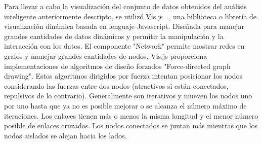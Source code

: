 Para llevar a cabo la visualización del conjunto de datos obtenidos del análisis inteligente anteriormente descripto, se utilizó Vis.js ~\cite{visjsPaginaWeb}, una biblioteca o librería de visualización dinámica basada en lenguaje Javascript. Diseñada para manejar grandes cantidades de datos dinámicos y permitir la manipulación y la interacción con los datos. El componente "Network" permite mostrar redes en grafos y manejar grandes cantidades de nodos. 
Vis.js proporciona implementaciones de algoritmos de diseño forzados "Force-directed graph drawing". Estos algoritmos dirigidos por fuerza intentan posicionar los nodos considerando las fuerzas entre dos nodos (atractivos si están conectados, repulsivos de lo contrario). Generalmente son iterativos y mueven los nodos uno por uno hasta que ya no es posible mejorar o se alcanza el número máximo de iteraciones. Los enlaces tienen más o menos la misma longitud y el menor número posible de enlaces cruzados. Los nodos conectados se juntan más mientras que los nodos aislados se alejan hacia los lados.
